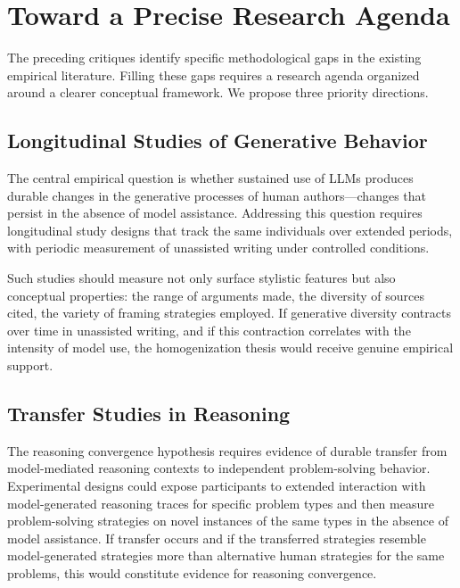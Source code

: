 \documentclass[12pt,a4paper]{article}
\theoremstyle{definition}
\theoremstyle{plain}
\theoremstyle{remark}
\begin{document}
\section{Toward a Precise Research Agenda}
\label{sec:agenda}

The preceding critiques identify specific methodological gaps in the existing empirical
literature. Filling these gaps requires a research agenda organized around a clearer
conceptual framework. We propose three priority directions.

\subsection{Longitudinal Studies of Generative Behavior}

The central empirical question is whether sustained use of LLMs produces durable changes in
the generative processes of human authors---changes that persist in the absence of model
assistance. Addressing this question requires longitudinal study designs that track the
same individuals over extended periods, with periodic measurement of unassisted writing
under controlled conditions.

Such studies should measure not only surface stylistic features but also conceptual
properties: the range of arguments made, the diversity of sources cited, the variety of
framing strategies employed. If generative diversity contracts over time in unassisted writing,
and if this contraction correlates with the intensity of model use, the homogenization thesis
would receive genuine empirical support.

\subsection{Transfer Studies in Reasoning}

The reasoning convergence hypothesis requires evidence of durable transfer from
model-mediated reasoning contexts to independent problem-solving behavior. Experimental
designs could expose participants to extended interaction with model-generated reasoning traces
for specific problem types and then measure problem-solving strategies on novel instances of
the same types in the absence of model assistance. If transfer occurs and if the transferred
strategies resemble model-generated strategies more than alternative human strategies for the
same problems, this would constitute evidence for reasoning convergence.
\end{document}
